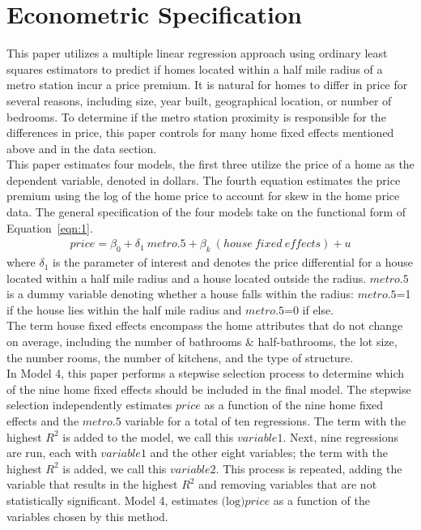 \documentclass[12pt]{report}
\newcommand\tab[1][.60cm]{\hspace*{#1}}
\begin{document}
\clearpage

\section*{Econometric Specification}
This paper utilizes a multiple linear regression approach using ordinary least squares estimators to predict if homes located within a half mile radius of a metro station incur a price premium. It is natural for homes to differ in price for several reasons, including size, year built, geographical location, or number of bedrooms. To determine if the metro station proximity is responsible for the differences in price, this paper controls for many home fixed effects mentioned above and in the data section.\\
\tab This paper estimates four models, the first three utilize the price of a home as the dependent variable, denoted in dollars. The fourth equation estimates the price premium using the log of the home price to account for skew in the home price data. The general specification of the four models take on the functional form of Equation~\ref{eqn:1}.
\begin{align}
\ price = \beta_0 +\delta_1\ metro.5 + \beta_k\ (house\ fixed\ effects )+ u \ 
\label{eqn:1}
\end{align}
where $\delta_1$ is the parameter of interest and denotes the price differential for a house located within a half mile radius and a house located outside the radius. $metro.5$ is a dummy variable denoting whether a house falls within the radius: $metro.5$=1 if the house lies within the half mile radius and $metro.5$=0 if else.\\
\tab The term house fixed effects encompass the home attributes that do not change on average, including the number of bathrooms \& half-bathrooms, the lot size, the number rooms, the number of kitchens, and the type of structure.\\
\tab In Model 4, this paper performs a stepwise selection process to determine which of the nine home fixed effects should be included in the final model. The stepwise selection independently estimates $price$ as a function of the nine home fixed effects and the $metro.5$ variable for a total of ten regressions. The term with the highest $R^2$ is added to the model, we call this $variable1$. Next, nine regressions are run, each with $variable1$ and the other eight variables; the term with the highest $R^2$ is added, we call this $variable2$. This process is repeated, adding the variable that results in the highest $R^2$ and removing variables that are not statistically significant. Model 4, estimates $\text{(log)}price$ as a function of the variables chosen by this method. \\
\end{document}
